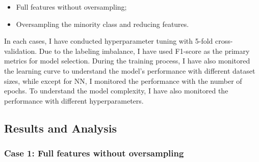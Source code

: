 \documentclass[conference]{IEEEtran}
\begin{document}
\begin{itemize}
    \item Full features without oversampling;
    \item Oversampling the minority class and reducing features.
\end{itemize}

In each cases, I have conducted hyperparameter tuning with 5-fold cross-validation. Due to the labeling imbalance, I have used F1-score as the primary metrics for model selection. During the training process, I have also monitored the learning curve to understand the model's performance with different dataset sizes, while except for NN, I monitored the performance with the number of epochs. To understand the model complexity, I have also monitored the performance with different hyperparameters.

\subsection{Results and Analysis}

\subsubsection{Case 1: Full features without oversampling \label{sec:dataset1-case1}}
\end{document}
